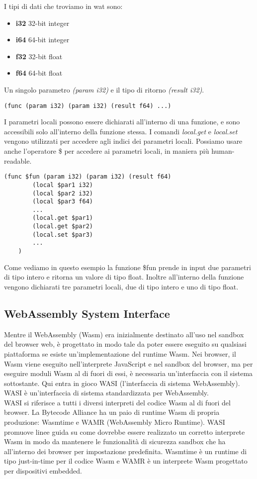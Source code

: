 \documentclass[../../main.tex]{subfiles}
\begin{document}
I tipi di dati che troviamo in wat sono:
\begin{itemize}
    \item \textbf{i32} 32-bit integer
    \item \textbf{i64} 64-bit integer
    \item \textbf{f32} 32-bit float
    \item \textbf{f64} 64-bit float
\end{itemize}
Un singolo  parametro \textit{(param i32)} e il tipo di ritorno \textit{(result i32)}.
\begin{lstlisting}[language=WebAssembly, caption={Esempio di funzione in wat}, label={lst:funzioneWat}]
    (func (param i32) (param i32) (result f64) ...)
\end{lstlisting}
I parametri locali possono essere dichiarati all'interno di una funzione, e sono accessibili solo all'interno della funzione stessa.
I comandi \textit{local.get} e \textit{local.set} vengono utilizzati per accedere agli indici dei parametri locali.
Possiamo usare anche l'operatore \$ per accedere ai parametri locali, in maniera più human-readable.
\begin{lstlisting}[language=WebAssembly, caption={Esempio di funzione in wat}, label={lst:funzioneWat}]
    (func $fun (param i32) (param i32) (result f64)
        (local $par1 i32)
        (local $par2 i32)
        (local $par3 f64)
        ...
        (local.get $par1)
        (local.get $par2)
        (local.set $par3)
        ...
    )
\end{lstlisting}
Come vediamo in questo esempio la funzione \$fun prende in input due parametri di tipo intero e ritorna un valore di tipo float. Inoltre all'interno della funzione vengono dichiarati tre parametri locali, due di tipo intero e uno di tipo float.

\subsection{WebAssembly System Interface}
Mentre il WebAssembly (Wasm) era inizialmente destinato all'uso nel sandbox del browser web, è progettato in modo tale da poter essere eseguito su qualsiasi piattaforma se esiste un'implementazione del runtime Wasm. Nei browser, il Wasm viene eseguito nell'interprete JavaScript e nel sandbox del browser, ma per eseguire moduli Wasm al di fuori di essi, è necessaria un'interfaccia con il sistema sottostante. Qui entra in gioco WASI (l'interfaccia di sistema WebAssembly).\\
WASI è un'interfaccia di sistema standardizzata per WebAssembly.\\
WASI si riferisce a tutti i diversi interpreti del codice Wasm al di fuori del browser. La Bytecode Alliance ha un paio di runtime Wasm di propria produzione: Wasmtime e WAMR (WebAssembly Micro Runtime). WASI promuove linee guida su come dovrebbe essere realizzato un corretto interprete Wasm in modo da mantenere le funzionalità di sicurezza sandbox che ha all'interno dei browser per impostazione predefinita. Wasmtime è un runtime di tipo just-in-time per il codice Wasm e WAMR è un interprete Wasm progettato per dispositivi embedded.\autocite{niemela2021webassembly}
\end{document}
